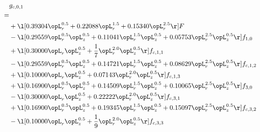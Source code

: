 \begin{alignat}{2} 
\label{eq:g_01_0} 
& g_{c,0,1} \nonumber \\ 
 = \\ 
& + \l[  0.39304 \opL_r^{0.5} +  0.22088 \opL_r^{1.5} +  0.15340 \opL_r^{2.5}  \r] F \nonumber \\ 
& - \l[  0.29559 \opL_r^{0.5} \opL_z^{0.5} +  0.11041 \opL_r^{1.5} \opL_z^{0.5} +  0.05753 \opL_r^{2.5} \opL_z^{0.5}  \r] f_{1,0} \nonumber \\ 
& + \l[  0.30000 \opL_r \opL_z^{0.5} + \frac{1}{7} \opL_r^{2.0} \opL_z^{0.5}  \r] f_{c,1,1} \nonumber \\ 
& - \l[  0.29559 \opL_r^{0.5} \opL_z^{0.5} +  0.14721 \opL_r^{1.5} \opL_z^{0.5} +  0.08629 \opL_r^{2.5} \opL_z^{0.5}  \r] f_{c,1,2} \nonumber \\ 
& + \l[  0.10000 \opL_r \opL_z^{0.5} +  0.07143 \opL_r^{2.0} \opL_z^{0.5}  \r] f_{c,1,3} \nonumber \\ 
& + \l[  0.16900 \opL_r^{0.5} \opL_z^{0.5} +  0.14509 \opL_r^{1.5} \opL_z^{0.5} +  0.10065 \opL_r^{2.5} \opL_z^{0.5}  \r] f_{3,0} \nonumber \\ 
& - \l[  0.30000 \opL_r \opL_z^{0.5} +  0.22222 \opL_r^{2.0} \opL_z^{0.5}  \r] f_{c,3,1} \nonumber \\ 
& + \l[  0.16900 \opL_r^{0.5} \opL_z^{0.5} +  0.19345 \opL_r^{1.5} \opL_z^{0.5} +  0.15097 \opL_r^{2.5} \opL_z^{0.5}  \r] f_{c,3,2} \nonumber \\ 
& - \l[  0.10000 \opL_r \opL_z^{0.5} + \frac{1}{9} \opL_r^{2.0} \opL_z^{0.5}  \r] f_{c,3,3} \nonumber \\ 
\end{alignat} 


